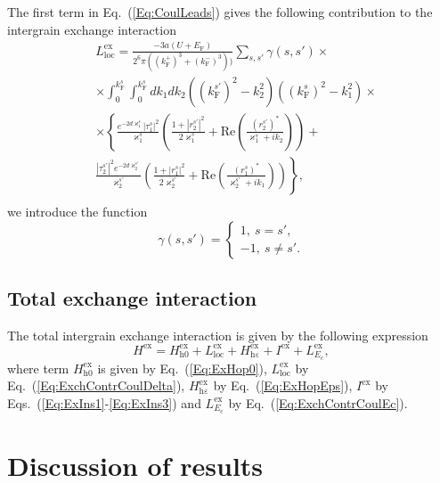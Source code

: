 \documentclass[aps,prb,amsmath,amssymb,twocolumn,superscriptaddress,showpacs,floatfix]{revtex4-1}
\begin{document}
The first term in Eq.~(\ref{Eq:CoulLeads}) gives the following contribution to the intergrain exchange interaction
\begin{equation}\label{Eq:ExchContrCoulDelta}
\begin{split}
&L^\mathrm{ex}_{\mathrm{loc}}=\frac{-3a(U+E_\mathrm F)}{2^6\pi((k_\mathrm F^+)^3+(k_\mathrm F^-)^3))}\sum_{s,s'}\gamma(s,s')\times\\&\times\int_0^{k_\mathrm F^s}\!\!\int_0^{k_\mathrm{F}^{s}}\!\!dk_1 dk_2((k_\mathrm F^{s'})^2-k_2^2)((k_\mathrm F^s)^2-k_1^2)\times\\&\times\left\{\frac{e^{-2d\varkappa^s_{1}}|\tau^s_{1}|^2}{\varkappa^s_{1}}\left(\frac{1+|r^{s'}_{2}|^2}{2\varkappa_1^s}+\mathrm{Re}\left(\frac{(r^{s'}_{2})^*}{\varkappa^s_{1}+ik_2}\right)\right)+\right.\\
&\left. \frac{|\tau^{s'}_{2}|^2e^{-2d\varkappa^{s'}_{2}}}{\varkappa^{s'}_{2}}\left(\frac{1+|r^{s}_{1}|^2}{2\varkappa_2^{s'}}+\mathrm{Re}\left(\frac{(r^{s}_1)^*}{\varkappa^{s'}_2+ik_1}\right)\right)\right\},\\
\end{split}
\end{equation}
we introduce the function
\begin{equation}
\gamma(s,s')=\left\{\begin{array}{l}1,~s=s',\\ -1,~ s\ne s'.\end{array}\right.
\end{equation}



\subsection{Total exchange interaction}


The total intergrain exchange interaction is given by the following expression
\begin{equation}\label{Eq:TotExFin}
H^\mathrm{ex}=H^\mathrm{ex}_\mathrm{h0}+L^\mathrm{ex}_{\mathrm{loc}}+H^\mathrm{ex}_\mathrm{h\varepsilon}+ I^\mathrm{ex}+L^\mathrm{ex}_{E_\mathrm c},
\end{equation}
where term $H^\mathrm{ex}_\mathrm{h0}$ is given by Eq.~(\ref{Eq:ExHop0}), $L^\mathrm{ex}_{\mathrm{loc}}$ by Eq.~(\ref{Eq:ExchContrCoulDelta}), $H^\mathrm{ex}_\mathrm{h\varepsilon}$ by Eq.~(\ref{Eq:ExHopEps}), $I^\mathrm{ex}$ by Eqs.~(\ref{Eq:ExIns1}-\ref{Eq:ExIns3}) and $L^\mathrm{ex}_{E_\mathrm c}$ by Eq.~(\ref{Eq:ExchContrCoulEc}).


\section{Discussion of results}\label{Sec:Discuss}
\end{document}

